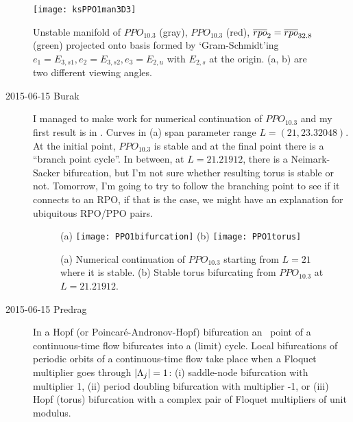 \begin{figure}[ht]
\begin{center}
      \texttt{[image: ksPPO1man3D3]}
\end{center}
    \caption[]{
       Unstable manifold of $PPO_{10.3}$ (gray), $PPO_{10.3}$ (red),
       $\overline{rpo}_{2}=\overline{rpo}_{32.8}$ (green) projected onto basis formed by
       `Gram-Schmidt'ing
       $e_1 = E_{3, s1}, e_2 = E_{3, s2}, e_3 = E_{2, u}$ with
       $E_{2, s}$ at the origin. (a, b) are two different viewing
       angles.
    }
    \label{f-ksPPO1man3D3}
\end{figure}

\begin{description}

\item[2015-06-15 Burak] I managed to make
 work for numerical
continuation of $PPO_{10.3}$ and my first result is in
. Curves in  (a)
span parameter range $L=(21, 23.32048)$. At the initial point,
$PPO_{10.3}$ is stable and at the final point there is a ``branch
point cycle''. In between, at $L = 21.21912$, there is a
Neimark-Sacker bifurcation, but I'm not sure whether resulting torus
is stable or not. Tomorrow, I'm going to try to follow the branching
point to see if it connects to an RPO, if that is the case, we might
have an explanation for ubiquitous RPO/PPO pairs.

\begin{figure}[ht]
\begin{center}
      (a) \texttt{[image: PPO1bifurcation]}
      (b) \texttt{[image: PPO1torus]}
\end{center}
    \caption[]{
       (a) Numerical continuation of $PPO_{10.3}$ starting from $L = 21$
       where it is stable.
       (b) Stable torus bifurcating from $PPO_{10.3}$ at $L=21.21912$.
    }
    \label{f-PPO1bifurcation}
\end{figure}

                                                                    \inCB
\item[2015-06-15 Predrag] In a Hopf (or Poincar\'e-Andronov-Hopf)
bifurcation an \eqv\ point of a continuous-time flow bifurcates into a
(limit) cycle. Local bifurcations of periodic orbits of a continuous-time
flow take place when a Floquet multiplier goes through $|\Lambda_j| =1$: (i)
saddle-node bifurcation with multiplier 1, (ii) period doubling
bifurcation with multiplier -1, or (iii) Hopf  (torus)  bifurcation with
a  complex  pair  of Floquet multipliers of unit modulus.


\end{description}
